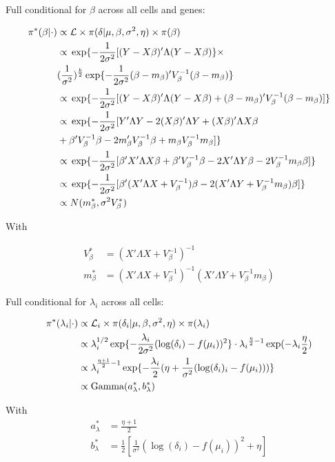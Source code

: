 \begin{Comment}
Full conditional for $\beta$ across all cells and genes:
\begin{fleqn}
\begin{align*}
\pi^*(\beta|\cdot)&\propto{} \mathcal{L}\times\pi(\delta|\mu,\beta,\sigma^2,\eta)\times\pi(\beta)\\
&\propto{}\exp\lbrace-\frac{1}{2\sigma^2}[(Y-X\beta)'\Lambda(Y-X\beta)\rbrace\times\\
&(\frac{1}{\sigma^2})^{\frac{k}{2}}\exp\lbrace-\frac{1}{2\sigma^2}(\beta-m_\beta)'V_\beta^{-1}(\beta-m_\beta)\rbrace\\
&\propto{}\exp\lbrace-\frac{1}{2\sigma^2}[(Y-X\beta)'\Lambda(Y-X\beta)+(\beta-m_\beta)'V_\beta^{-1}(\beta-m_\beta)]\rbrace\\
&\propto{}\exp\lbrace-\frac{1}{2\sigma^2}[Y'\Lambda{}Y-2(X\beta)'\Lambda{}Y+(X\beta)'\Lambda{}X\beta\\
&+\beta'V_\beta^{-1}\beta-2m_\beta'V_\beta^{-1}\beta+m_\beta{}V_\beta^{-1}m_\beta{}]\rbrace\\
&\propto{}\exp\lbrace-\frac{1}{2\sigma^2}[\beta'X'\Lambda{}X\beta+\beta'V_\beta^{-1}\beta-2X'\Lambda{}Y\beta-2V_\beta^{-1}m_\beta\beta]\rbrace\\
&\propto{}\exp\lbrace-\frac{1}{2\sigma^2}[\beta'(X'\Lambda{}X+V_\beta^{-1})\beta-2(X'\Lambda{}Y+V_\beta^{-1}m_\beta)\beta]\rbrace\\
&\propto{}N(m^*_\beta,\sigma^2V^*_\beta)
\end{align*}
\end{fleqn} With
\begin{fleqn}
\begin{align*}
V^*_\beta&=(X'\Lambda{}X+V_\beta^{-1})^{-1}\\
m^*_\beta&=(X'\Lambda{}X+V_\beta^{-1})^{-1}(X'\Lambda{}Y+V_\beta^{-1}m_\beta{})
\end{align*}

Full conditional for $\lambda_i$ across all cells:
\begin{fleqn}
\begin{align*}
\pi^*(\lambda_i|\cdot)&\propto{}\mathcal{L}_i\times\pi(\delta_i|\mu,\beta,\sigma^2,\eta)\times\pi(\lambda_i)\\
&\propto{}\lambda_i^{1/2}\exp\lbrace-\frac{\lambda_i}{2\sigma^2}(\log(\delta_i)-f(\mu_i))^2\rbrace\cdot\lambda_i{}^{\frac{\eta}{2}-1}\exp(-\lambda_i{}\frac{\eta}{2})\\
&\propto{}\lambda_i^{\frac{\eta+1}{2}-1}\exp\lbrace-\frac{\lambda_i}{2}(\eta+\frac{1}{\sigma^2}(\log(\delta_i)_i-f(\mu_i)))\rbrace\\
&\propto{}\textnormal{Gamma}(a^*_\lambda,b^*_\lambda)
\end{align*}
\end{fleqn}
With
\begin{align*}
a^*_\lambda&=\frac{\eta+1}{2}\\
b^*_\lambda&=\frac{1}{2}\left[\frac{1}{\sigma^2}(\log(\delta_i)-f(\mu_i))^2+\eta\right]
\end{align*}
\end{fleqn}

\end{Comment}


